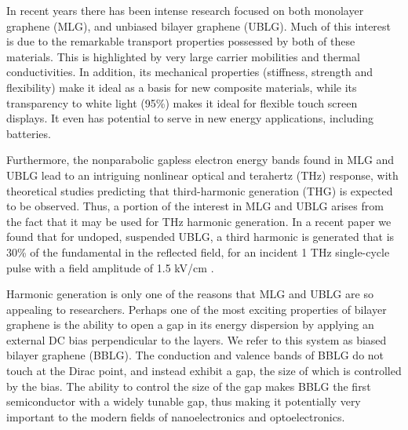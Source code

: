 \documentclass[twocolumn,secnumarabic,amssymb, nobibnotes, aps, prd, superscriptaddress]{revtex4-1}
\begin{document}
In recent years there has been intense research focused on both monolayer graphene (MLG), and unbiased bilayer graphene (UBLG). Much of this interest is due to the remarkable transport properties possessed by both of these materials. This is highlighted by very large carrier mobilities and thermal conductivities. In addition, its mechanical properties (stiffness, strength and flexibility) make it ideal as a basis for new composite materials, while its transparency to white light (95\%) makes it ideal for flexible touch screen displays. It even has potential to serve in new energy applications, including batteries\cite{Novo:graphene2005,  Morozov:GiantIntrinsic2008, geim:riseofgraphene2007, geim2009graphene,  allen2009honeycomb, novoselov2011nobel, novoselov2012roadmap, yoo2011ultrathin, wang2012review, kucinskis2013graphene}.

Furthermore, the nonparabolic gapless electron energy bands found in MLG and UBLG lead to an intriguing nonlinear optical and terahertz (THz) response, with theoretical studies predicting that third-harmonic generation (THG) is expected to be observed\cite{al2014high, al2015optimizing, mcgouran2016nonlinear}. Thus, a portion of the interest in MLG and UBLG arises from the fact that it may be used for THz harmonic generation. In a recent paper we found that for undoped, suspended UBLG, a third harmonic is generated that is 30\% of the fundamental in the reflected field, for an incident 1 THz single-cycle pulse with a field amplitude of 1.5  kV/cm \cite{mcgouran2016nonlinear}.

Harmonic generation is only one of the reasons that MLG and UBLG are so appealing to researchers. Perhaps one of the most exciting properties of bilayer graphene is the ability to open a gap in its energy dispersion by applying an external DC bias perpendicular to the layers. We refer to this system as biased bilayer graphene (BBLG). The conduction and valence bands of BBLG do not touch at the Dirac point, and instead exhibit a gap, the size of which is controlled by the bias\cite{mccann2006asymmetry, castro2007biased, neto2009electronic, mccann2013electronic}. The ability to control the size of the gap makes BBLG the first semiconductor with a widely tunable gap, thus making it potentially very important to the modern fields of nanoelectronics and optoelectronics. 
\end{document}

